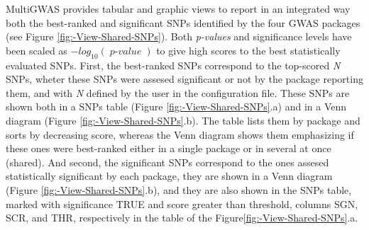 \documentclass{article}
\newcommand{\mathB}[1]{{\operatorname{\mathit{#1}}}}
\begin{document}
MultiGWAS provides tabular and graphic views to report in an integrated way both the best-ranked and significant SNPs identified by the four GWAS packages (see Figure \ref{fig:-View-Shared-SNPs}). Both \emph{p-values} and significance levels have been scaled as $-log_{10}(\mathB{p-value})$ to give high scores to the best statistically evaluated SNPs. First, the best-ranked SNPs correspond to the top-scored \emph{N} SNPs, wheter these SNPs were assesed significant or not by the package reporting them, and with\emph{ N} defined by the user in the configuration file. These SNPs are shown both in a SNPs table (Figure \ref{fig:-View-Shared-SNPs}.a) and in a Venn diagram (Figure \ref{fig:-View-Shared-SNPs}.b). The table lists them by package and sorts by decreasing score, whereas the Venn diagram shows them emphasizing if these ones were best-ranked either in a single package or in several at once (shared). And second, the significant SNPs correspond to the ones assesed statistically significant by each package, they are shown in a Venn diagram (Figure \ref{fig:-View-Shared-SNPs}.b), and they are also shown in the SNPs table, marked with significance TRUE and score greater than threshold, columns SGN, SCR, and THR, respectively in the table of the Figure\ref{fig:-View-Shared-SNPs}.a.
\end{document}
